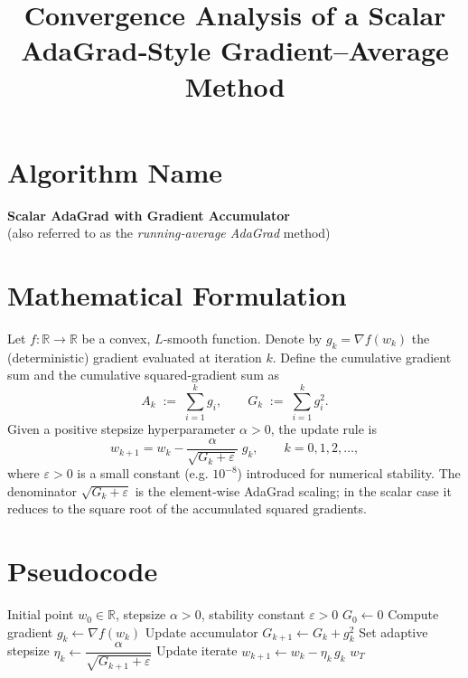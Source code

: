 \documentclass[11pt]{article}
\newcommand{\R}{\mathbb{R}}
\begin{document}
\title{Convergence Analysis of a Scalar AdaGrad‑Style Gradient–Average Method}
\author{}
\date{}
\maketitle

\section*{Algorithm Name}
\textbf{Scalar AdaGrad with Gradient Accumulator}\\
(also referred to as the \emph{running‑average AdaGrad} method)

\section*{Mathematical Formulation}
Let $f:\R\rightarrow\R$ be a convex, $L$‑smooth function.  
Denote by $g_k=\nabla f(w_k)$ the (deterministic) gradient evaluated at iteration $k$.
Define the cumulative gradient sum and the cumulative squared‑gradient sum as
\[
A_k \;:=\; \sum_{i=1}^{k} g_i ,\qquad
G_k \;:=\; \sum_{i=1}^{k} g_i^{2}.
\]
Given a positive stepsize hyperparameter $\alpha>0$, the update rule is
\begin{equation}
\boxed{
w_{k+1}= w_k-\frac{\alpha}{\sqrt{G_k+\varepsilon}}\; g_k},
\qquad k=0,1,2,\dots,
\label{eq:update}
\end{equation}
where $\varepsilon>0$ is a small constant (e.g. $10^{-8}$) introduced for numerical stability.  
The denominator $\sqrt{G_k+\varepsilon}$ is the element‑wise AdaGrad scaling; in the scalar case it reduces to the square root of the accumulated squared gradients.

\section*{Pseudocode}
\begin{algorithm}[H]
\caption{Scalar AdaGrad with Gradient Accumulator}
\begin{algorithmic}[1]
\REQUIRE Initial point $w_0\in\R$, stepsize $\alpha>0$, stability constant $\varepsilon>0$
\STATE $G_0 \gets 0$ 
    \STATE Compute gradient $g_k \gets \nabla f(w_k)$
    \STATE Update accumulator $G_{k+1} \gets G_k + g_k^{2}$
    \STATE Set adaptive stepsize $\eta_k \gets \dfrac{\alpha}{\sqrt{G_{k+1}+\varepsilon}}$
    \STATE Update iterate $w_{k+1} \gets w_k - \eta_k\, g_k$
\ENDFOR
\RETURN $w_T$
\end{algorithmic}
\end{algorithm}
\end{document}
